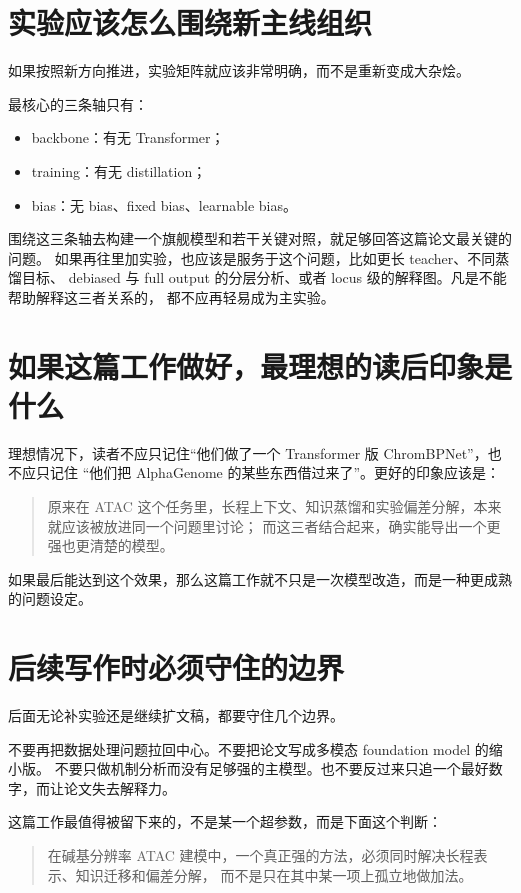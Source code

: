 \documentclass[11pt,a4paper]{ctexart}
\begin{document}
\section*{实验应该怎么围绕新主线组织}

如果按照新方向推进，实验矩阵就应该非常明确，而不是重新变成大杂烩。

最核心的三条轴只有：
\begin{itemize}
  \item backbone：有无 Transformer；
  \item training：有无 distillation；
  \item bias：无 bias、fixed bias、learnable bias。
\end{itemize}

围绕这三条轴去构建一个旗舰模型和若干关键对照，就足够回答这篇论文最关键的问题。
如果再往里加实验，也应该是服务于这个问题，比如更长 teacher、不同蒸馏目标、
debiased 与 full output 的分层分析、或者 locus 级的解释图。凡是不能帮助解释这三者关系的，
都不应再轻易成为主实验。

\section*{如果这篇工作做好，最理想的读后印象是什么}

理想情况下，读者不应只记住“他们做了一个 Transformer 版 ChromBPNet”，也不应只记住
“他们把 AlphaGenome 的某些东西借过来了”。更好的印象应该是：

\begin{quote}
原来在 ATAC 这个任务里，长程上下文、知识蒸馏和实验偏差分解，本来就应该被放进同一个问题里讨论；
而这三者结合起来，确实能导出一个更强也更清楚的模型。
\end{quote}

如果最后能达到这个效果，那么这篇工作就不只是一次模型改造，而是一种更成熟的问题设定。

\section*{后续写作时必须守住的边界}

后面无论补实验还是继续扩文稿，都要守住几个边界。

不要再把数据处理问题拉回中心。不要把论文写成多模态 foundation model 的缩小版。
不要只做机制分析而没有足够强的主模型。也不要反过来只追一个最好数字，而让论文失去解释力。

这篇工作最值得被留下来的，不是某一个超参数，而是下面这个判断：
\begin{quote}
在碱基分辨率 ATAC 建模中，一个真正强的方法，必须同时解决长程表示、知识迁移和偏差分解，
而不是只在其中某一项上孤立地做加法。
\end{quote}
\end{document}
